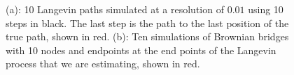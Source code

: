 \begin{figure}[H]%
    \centering
    \qquad
    \caption[Langevin and Brownian bridge paths]{(a): 10 Langevin paths simulated at a resolution of $0.01$ using 10 steps in black. The last step is the path to the last position of the true path, shown in red. (b): Ten simulations of Brownian bridges with 10 nodes and endpoints at the end points of the Langevin process that we are estimating, shown in red.}%
    \label{fig:monte carlo paths}%
\end{figure}


